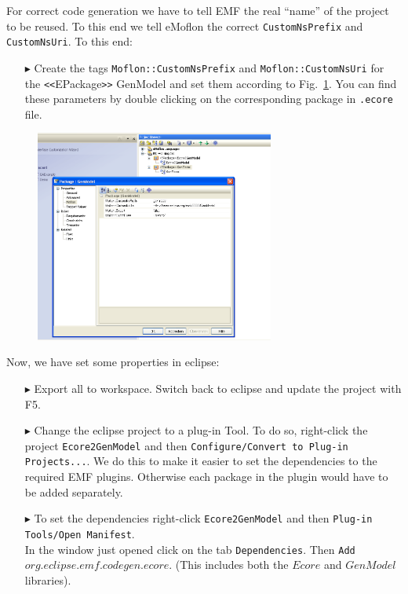 For correct code generation we have to tell EMF the real ``name'' of the project to be reused. To this end we tell eMoflon the correct \texttt{CustomNsPrefix} and \texttt{CustomNsUri}. To this end:
\begin{enumerate}
\item[$\blacktriangleright$] Create the tags  \texttt{Moflon::CustomNsPrefix} and \texttt{Moflon::CustomNsUri} for the \texttt{<<}EPackage\texttt{>>} \textsf{GenModel} and set them according to Fig.~\ref{fig_customNS}.
You can find these parameters by double clicking on the corresponding package in \texttt{.ecore} file.
\end{enumerate}

\begin{figure}[htbp]
\begin{center}  \includegraphics[width=0.7\textwidth]{pics/Ecore2GenModel_Bilder/8_nsUriPre.png}
  \caption{}  
  \label{fig_customNS}
\end{center}
\end{figure}

Now, we have set some properties in eclipse:

\begin{enumerate}
\item[$\blacktriangleright$]Export all to workspace. Switch back to eclipse and update the project with F5.

\item[$\blacktriangleright$]Change the eclipse project to a plug-in Tool. To do so, right-click the project \texttt{Ecore2GenModel} and then \texttt{Configure/Convert to Plug-in Projects...}.
We do this to make it easier to set the dependencies to the required EMF plugins. Otherwise each package in the plugin would have to be added separately.

\item[$\blacktriangleright$]To set the dependencies right-click \texttt{Ecore2GenModel} and then \texttt{Plug-in Tools/Open Manifest}.\\
In the window just opened click on the tab \texttt{Dependencies}. Then \texttt{Add} $org.eclipse.emf.codegen.ecore$. (This includes both the $Ecore$ and $GenModel$ libraries).


\end{enumerate}

